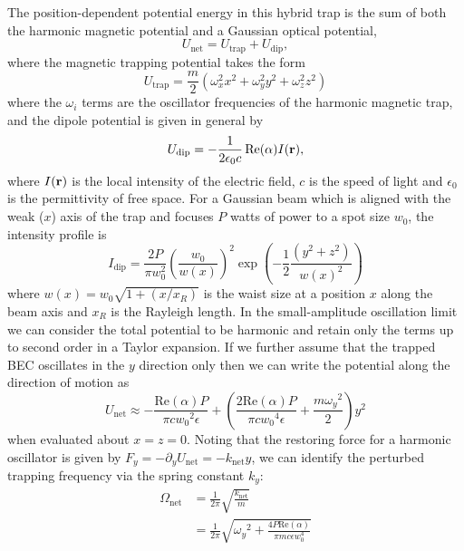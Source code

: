 	The position-dependent potential energy in this hybrid trap is the sum of both the harmonic magnetic potential and a Gaussian optical potential,
	\begin{equation}
		U_\mathrm{net} = U_{\mathrm{trap}} + U_\mathrm{dip},
	\end{equation}
	where the magnetic trapping potential takes the form
	\begin{equation}
		U_\mathrm{trap} = \frac{m}{2}\left(\omega_{x}^{2}x^2+\omega_{y}^{2}y^2+\omega_{z}^{2}z^2 \right)
	\end{equation}
	where the $\omega_i$ terms are the oscillator frequencies of the harmonic magnetic trap, and the dipole potential is given in general by  \cite{Grimm00}
	\begin{align}
	    U_{\mathrm{dip}}=-\frac{1}{2 \epsilon_{0} c} \operatorname{Re}(\alpha) I(\textbf{r}),
	\end{align}
	where $I(\textbf{r})$ is the local intensity of the electric field, $c$ is the speed of light and $\epsilon_0$ is the permittivity of free space.
	For a Gaussian beam which is aligned with the weak ($x$) axis of the trap and focuses $P$ watts of power to a spot size $w_0$, the intensity profile is 
	\begin{equation}
	    I_{\mathrm{dip}} =
	        \frac{2 P}{\pi w_0^2} \left(\frac{w_0}{w(x)}\right)^2 \exp\left( -\frac{1}{2} \frac{(y^2+z^2)}{w(x)^2} \right)
	 \end{equation}
	 where $w(x) = w_0\sqrt{1+(x/x_R)}$ is the waist size at a position $x$ along the beam axis and $x_R$ is the Rayleigh length. 
	 In the small-amplitude oscillation limit we can consider the total potential to be harmonic and retain only the terms up to second order in a Taylor expansion. If we further assume that the trapped BEC oscillates in the $y$ direction only then we can write the potential along the direction of motion as
	 \begin{equation}
	 U_\mathrm{net} \approx -\frac{\mathrm{Re}(\alpha)  P}{\pi 
   c {w_0}^2 \epsilon} + \left(\frac{2 \mathrm{Re}(\alpha)  P}{\pi  c {w_0}^4 \epsilon }+\frac{m {\omega_y}^2}{2}\right) y^2
	 \end{equation}
	 when evaluated about $x=z=0$.
	 Noting that the restoring force for a harmonic oscillator is given by $F_y = -\partial_y U_\mathrm{net} = -k_\mathrm{net} y$, we can identify the perturbed trapping frequency via the spring constant $k_y$:
	 \begin{align}
	 	\Omega_\mathrm{net} &= \frac{1}{2\pi}\sqrt{\frac{k_\mathrm{net}}{m}}\\
	 	&= \frac{1}{2\pi}\sqrt{{\omega_y}^2+\frac{4 P \mathrm{Re}(\alpha)}{\pi m c \epsilon w_{0}^4}}
	 \end{align}
